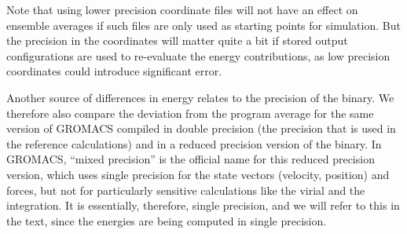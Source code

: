 Note that using lower precision coordinate files will not have an
effect on ensemble averages if such files are only used as starting
points for simulation. But the precision in the coordinates will
matter quite a bit if stored output configurations are used to
re-evaluate the energy contributions, as low precision coordinates could introduce
significant error.


Another source of differences in energy relates to the precision of
the binary.  We therefore also compare the deviation from the program
average for the same version of GROMACS compiled in double precision
(the precision that is used in the reference calculations) and in a
reduced precision version of the binary. In GROMACS, ``mixed
precision'' is the official name for this reduced precision version,
which uses single precision for the state vectors (velocity, position)
and forces, but not for particularly sensitive calculations like the
virial and the integration. It is essentially, therefore, single
precision, and we will refer to this in the text, since the energies
are being computed in single precision.


